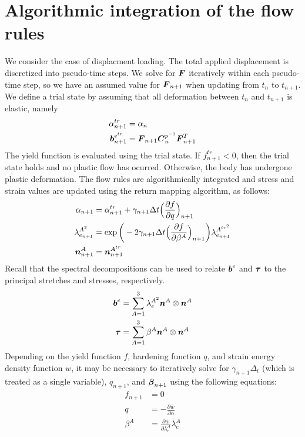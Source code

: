 \documentclass[10pt]{article}
\begin{document}
\section{Algorithmic integration of the flow rules}
We consider the case of displacment loading. The total applied displacement is discretized into pseudo-time steps. We solve for $\mbox{\boldmath$ F$}$ iteratively within each pseudo-time step, so we have an assumed value for $\mbox{\boldmath$ F$}_{n+1}$ when updating from $t_n$ to $t_{n+1}$. We define a trial state by assuming that all deformation between $t_n$ and $t_{n+1}$ is elastic, namely
\begin{align}
\alpha^{tr}_{n+1} &= \alpha_n\\
\mbox{\boldmath$ b$}^{e^{tr}}_{n+1} &= \mbox{\boldmath$ F$}_{n+1}\mbox{\boldmath$ C$}^{p^{-1}}_n\mbox{\boldmath$ F$}_{n+1}^T
\end{align}
The yield function is evaluated using the trial state. If $f_{n+1}^{tr} < 0$, then the trial state holds and no plastic flow has ocurred. Otherwise, the body has undergone plastic deformation. The flow rules are algorithmically integrated and stress and strain values are updated using the return mapping algorithm, as follows:
\begin{align}
\alpha_{n+1} &= \alpha_{n+1}^{tr} + \gamma_{n+1}\Delta t
\Big(\frac{\partial f}{\partial q}\Big)_{n+1}\\
\lambda_{e_{n+1}}^{A^2} &= \exp\bigg(-2\gamma_{n+1}\Delta t
\Big(\frac{\partial f}{\partial \beta^A}\Big)_{n+1}\bigg)
\lambda_{e_{n+1}}^{A^{{tr}^2}}\\
\mbox{\boldmath$ n$}^A_{n+1} &= \mbox{\boldmath$ n$}^{A^{tr}}_{n+1}
\end{align}
Recall that the spectral decompositions can be used to relate $\mbox{\boldmath$ b$}^e$ and $\mbox{\boldmath$\tau$}$ to the principal stretches and stresses, respectively.
\begin{align}
\mbox{\boldmath$ b$}^e &= \sum_{A=1}^3 \lambda_e^{A^2} \mbox{\boldmath$ n$}^A \otimes \mbox{\boldmath$ n$}^A\\
\mbox{\boldmath$\tau$} &= \sum_{A=1}^3 \beta^A \mbox{\boldmath$ n$}^A \otimes \mbox{\boldmath$ n$}^A
\end{align}
Depending on the yield function $f$, hardening function $q$, and strain energy density function $w$, it may be necessary to iteratively solve for $\gamma_{n+1} \Delta_t$ (which is treated as a single variable), $q_{n+1}$, and $\mbox{\boldmath$\beta$}_{n+1}$ using the following equations:
\begin{align}
f_{n+1} &= 0\\
q &= -\frac{\partial \bar{w}}{\partial \alpha}\\
\beta^A &= \frac{\partial \bar{w}}{\partial \lambda_e^{A}}\lambda_e^{A}
\end{align}
\end{document}
